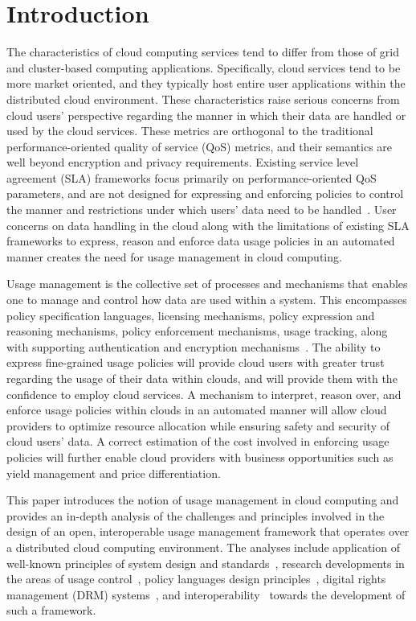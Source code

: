 \documentclass[10pt, conference, compsocconf]{IEEEtran}
\begin{document}
\section{Introduction}
The characteristics of cloud computing services tend to differ from those of grid and cluster-based computing applications.  Specifically, cloud services tend to be more market oriented, and they typically host entire user applications within the distributed cloud environment. These characteristics raise serious concerns from cloud users' perspective regarding the manner in which their data are handled or used by the cloud services. These metrics are orthogonal to the traditional performance-oriented quality of service (QoS) metrics, and their semantics are well beyond encryption and privacy requirements. Existing service level agreement (SLA) frameworks focus primarily on performance-oriented QoS parameters, and are not designed for expressing and enforcing policies to control the manner and restrictions under which users' data need to be handled~\cite{WSA, WSLA, WSP,PaRaSh:09}. User concerns on data handling in the cloud along with the limitations of existing SLA frameworks to express, reason and enforce data usage policies in an automated manner creates the need for usage management in cloud computing. 
 
Usage management is the collective set of processes and mechanisms that enables one to manage and control how data are
used within a system. This encompasses policy specification languages, licensing mechanisms, policy expression and reasoning mechanisms, policy enforcement mechanisms, usage tracking, along with supporting authentication and encryption mechanisms~\cite{PaSa:04,JaHeLa:10}. The ability to express fine-grained usage policies will provide cloud users with greater trust regarding the usage of their data within clouds, and will provide them with the confidence to employ cloud services. A mechanism to interpret, reason over, and enforce usage policies within clouds in an automated manner will allow cloud providers to optimize resource allocation while ensuring safety and security of cloud users' data. A correct estimation of the cost involved in enforcing usage policies will further enable cloud providers with business opportunities such as yield management and price differentiation. 

This paper introduces the notion of usage management in cloud computing and provides an in-depth analysis of the challenges and principles involved in the design of an open, interoperable usage management framework that operates over a distributed cloud computing environment. The analyses include application of well-known principles of system design and standards~\cite{BlCl:01,Cl:88,ClWrSoBr:02}, research developments in the areas of usage control~\cite{PaSa:04,JaHeLa:10}, policy languages design principles~\cite{JaHeMa:06}, digital rights management (DRM) systems~\cite{JaHe:09},  and interoperability~\cite{JaHe:04,HeJa:05,KoLaMaMi:04} towards the development of such a framework.
\end{document}
